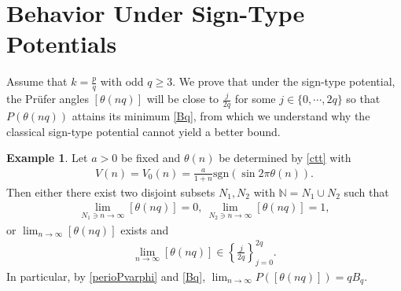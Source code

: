 \documentclass[12pt]{amsart}
\theoremstyle{plain}
\theoremstyle{definition}
\newtheorem{example}[theorem]{Example}
\begin{document}
\section{Behavior Under Sign-Type Potentials}
Assume that $k=\frac{p}{q}$ with odd $q\geq 3$. We prove that under the sign-type potential, the Pr\"ufer angles $[\theta(nq)]$ will be close to $\frac{j}{2q}$ for some $j\in\{0,\cdots,2q\}$ so that $P(\theta(nq))$ attains its minimum \eqref{Bq}, from which we understand why the classical sign-type potential cannot yield a better bound.
\begin{example}
	Let $a>0$ be fixed and $\theta(n)$ be determined by \eqref{ctt} with
	\begin{align}
		V(n)=V_0(n)=\frac{a}{1+n}\mathrm{sgn}(\sin2\pi\theta(n)).\label{apdev}
	\end{align}
	Then either there exist two disjoint subsets $N_1,N_2$ with $\mathbb{N}=N_1\cup N_2$ such that 
	\begin{align}
		\lim_{N_1\ni n\to\infty}[\theta(nq)]=0,\ \lim_{N_2\ni n\to\infty}[\theta(nq)]=1,\nonumber
	\end{align}
	or $\lim_{n\to\infty}[\theta(nq)]$ exists and 
	\begin{align}
		\lim_{n\to\infty}[\theta(nq)]\in\left\{\frac{j}{2q}\right\}_{j=0}^{2q}.
	\end{align}
	In particular, by \eqref{perioPvarphi} and \eqref{Bq}, $\lim_{n\to\infty}P([\theta(nq)])=qB_q$.
\end{example}
\end{document}
